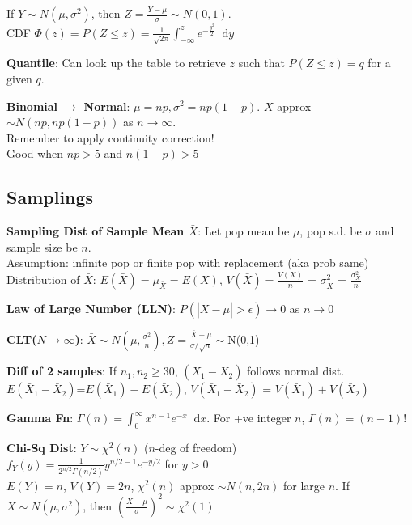 \documentclass[a4paper,landscape]{article}
\newcommand{\rntopic}[1]{\vspace{-2.0em}\subsection*{#1}\vspace{-1.0em}}
\newcommand{\rnname}[1]{\textbf{#1}}
\newcommand*\dif{\mathop{}\!\mathrm{d}}
\begin{document}
\begin{multicols*}{4}
\begin{flatitemize}
If $Y \sim N(\mu, \sigma^2)$, then $Z = \frac{Y-\mu}{\sigma} \sim N(0, 1)$. \\
CDF $\Phi(z) = P(Z \leq z) = \frac{1}{\sqrt{2\pi}}\int_{-\infty}^{z}e^{-\frac{y^2}{2}}\dif y$
\item \rnname{Quantile}: Can look up the table to retrieve $z$ such that $P(Z\leq z) = q$ for a given $q$.
\item\rnname{Binomial $\rightarrow$ Normal}: $\mu = np, \sigma^2 = np(1-p)$. $X$ approx $\sim N(np, np(1-p))$ as $n \rightarrow \infty$. \\
Remember to apply continuity correction! \\
Good when $np > 5$ and $n(1-p) > 5$
\end{flatitemize}
\begin{flatitemize}
\rntopic{Samplings}
\item \rnname{Sampling Dist of Sample Mean $\bar X$}: Let pop mean be $\mu$, pop s.d. be $\sigma$ and sample size be $n$. \\
Assumption: infinite pop or finite pop with replacement (aka prob same)\\
Distribution of $\bar X$: $E(\bar X) = \mu_{\bar X} = E(X)$, $V(\bar X) = \frac{V(X)}{n}$ = $\sigma_{\bar X}^{2}$ = $\frac{\sigma_X^2}{n}$
\item \rnname{Law of Large Number (LLN)}: $P(|\bar X - \mu| > \epsilon) \rightarrow 0$ as $n \rightarrow 0$
\item \rnname{CLT($N\rightarrow\infty$)}: $\bar X \sim N(\mu, \frac{\sigma^2}{n}),Z=\frac{\bar X - \mu}{\sigma / \sqrt{n}} \sim$N(0,1)
\item \rnname{Diff of 2 samples}: If $n_1, n_2 \geq 30$, $(\bar X_1 - \bar X_2)$ follows normal dist. $E(\bar X_1 - \bar X_2)$=$E(\bar X_1) - E(\bar X_2)$, $V(\bar X_1 - \bar X_2)$ = $V(\bar X_1) + V(\bar X_2)$
\item \rnname{Gamma Fn}: $\Gamma(n) = \int_{0}^{\infty} x^{n-1}e^{-x} \dif x$. For +ve integer $n$, $\Gamma(n) =(n-1)!$
\item \rnname{Chi-Sq Dist}: $Y \sim \chi^2(n)$ ($n$-deg of freedom)\\
$f_Y(y) = \frac{1}{2^{n/2}\Gamma(n/2)}y^{n/2-1}e^{-y/2}$ for $y>0$ \\
$E(Y) = n$, $V(Y) = 2n$, $\chi^2(n)$ approx $\sim N(n, 2n)$ for large $n$. If $X \sim N(\mu, \sigma^2)$, then $(\frac{X - \mu}{\sigma})^2 \sim \chi^2(1)$ \\

\end{flatitemize}
\end{multicols*}
\end{document}
